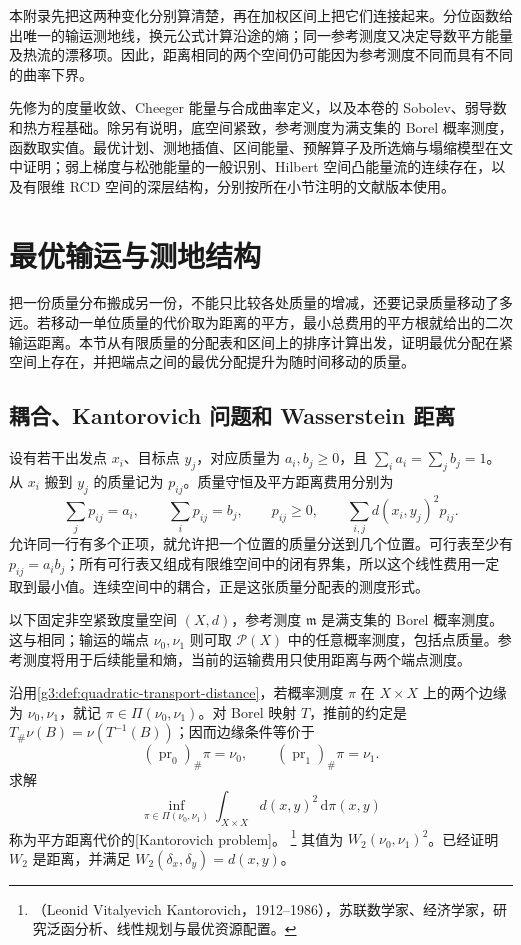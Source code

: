 \ProseParagraphBreak
本附录先把这两种变化分别算清楚，再在加权区间上把它们连接起来。分位函数给出唯一的输运测地线，换元公式计算沿途的熵；同一参考测度又决定导数平方能量及热流的漂移项。因此，距离相同的两个空间仍可能因为参考测度不同而具有不同的曲率下界。

\ProseParagraphBreak
先修为的度量收敛、Cheeger 能量与合成曲率定义，以及本卷的 Sobolev、弱导数和热方程基础。除另有说明，底空间紧致，参考测度为满支集的 Borel 概率测度，函数取实值。最优计划、测地插值、区间能量、预解算子及所选熵与塌缩模型在文中证明；弱上梯度与松弛能量的一般识别、Hilbert 空间凸能量流的连续存在，以及有限维 RCD 空间的深层结构，分别按所在小节注明的文献版本使用。

\section{最优输运与测地结构}
\label{g3:sec:C01}

把一份质量分布搬成另一份，不能只比较各处质量的增减，还要记录质量移动了多远。若移动一单位质量的代价取为距离的平方，最小总费用的平方根就给出的二次输运距离。本节从有限质量的分配表和区间上的排序计算出发，证明最优分配在紧空间上存在，并把端点之间的最优分配提升为随时间移动的质量。

\subsection{耦合、Kantorovich 问题和 Wasserstein 距离}
\label{g3:subsec:C01:01}

设有若干出发点 \(x_i\)、目标点 \(y_j\)，对应质量为 \(a_i,b_j\ge0\)，且
\(\sum_i a_i=\sum_jb_j=1\)。从 \(x_i\) 搬到 \(y_j\) 的质量记为 \(p_{ij}\)。质量守恒及平方距离费用分别为
\[
	\sum_jp_{ij}=a_i,\qquad
	\sum_ip_{ij}=b_j,\qquad p_{ij}\ge0,
	\qquad
	\sum_{i,j}d(x_i,y_j)^2p_{ij}.
\]
允许同一行有多个正项，就允许把一个位置的质量分送到几个位置。可行表至少有 \(p_{ij}=a_ib_j\)；所有可行表又组成有限维空间中的闭有界集，所以这个线性费用一定取到最小值。连续空间中的耦合，正是这张质量分配表的测度形式。

\ProseParagraphBreak
以下固定非空紧致度量空间 \((X,d)\)，参考测度 \(\mathfrak m\) 是满支集的 Borel 概率测度。这与相同；输运的端点 \(\nu_0,\nu_1\) 则可取 \(\mathcal P(X)\) 中的任意概率测度，包括点质量。参考测度将用于后续能量和熵，当前的运输费用只使用距离与两个端点测度。

\ProseParagraphBreak
沿用\cref{g3:def:quadratic-transport-distance}，若概率测度 \(\pi\) 在 \(X\times X\) 上的两个边缘为 \(\nu_0,\nu_1\)，就记
\(\pi\in\Pi(\nu_0,\nu_1)\)。对 Borel 映射 \(T\)，推前的约定是
\(T_\#\nu(B)=\nu(T^{-1}(B))\)；因而边缘条件等价于
\[
	(\operatorname{pr}_0)_\#\pi=\nu_0,\qquad
	(\operatorname{pr}_1)_\#\pi=\nu_1.
\]
求解
\[
	\inf_{\pi\in\Pi(\nu_0,\nu_1)}
	\int_{X\times X}d(x,y)^2\,\mathrm d\pi(x,y)
\]
称为平方距离代价的[Kantorovich problem]。%
\footnote{（Leonid Vitalyevich Kantorovich，1912--1986），苏联数学家、经济学家，研究泛函分析、线性规划与最优资源配置。}
其值为 \(W_2(\nu_0,\nu_1)^2\)。已经证明 \(W_2\) 是距离，并满足
\(W_2(\delta_x,\delta_y)=d(x,y)\)。

